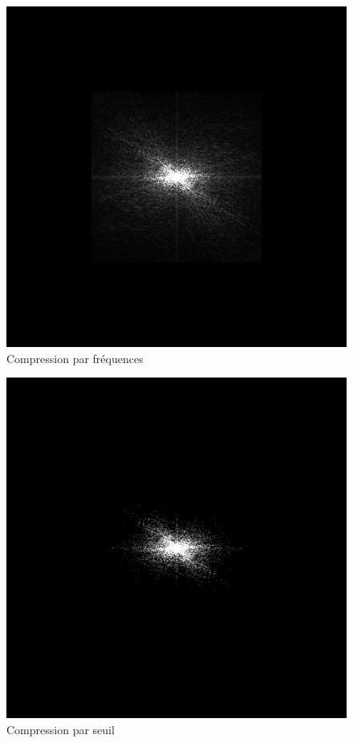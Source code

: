 \documentclass{article}
\begin{document}
\begin{figure}
	\begin{center}
		\includegraphics[scale=0.4]{lena_compresse}\\
		Compression par fréquences
	\end{center}
\end{figure}
\begin{figure}
	\begin{center}
		\includegraphics[scale=0.4]{lena_compresse_seuil}\\
		Compression par seuil
	\end{center}
\end{figure}
\end{document}

